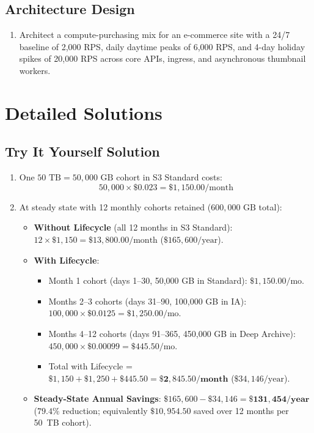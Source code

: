 \subsection*{Architecture Design}
\begin{enumerate}[label=\textbf{Exercise~\thechapter.\arabic*}, leftmargin=*, start=4]
  \item Architect a compute-purchasing mix for an e-commerce site with a 24/7 baseline of 2,000 RPS, daily daytime peaks of 6,000 RPS, and 4-day holiday spikes of 20,000 RPS across core APIs, ingress, and asynchronous thumbnail workers.
\end{enumerate}

\section{Detailed Solutions}

\subsection*{Try It Yourself Solution}
\begin{enumerate}[leftmargin=18pt]
  \item One $50\text{ TB} = 50,000\text{ GB}$ cohort in S3 Standard costs:
  $$50,000 \times \$0.023 = \$1,150.00\text{/month}$$
  \item At steady state with 12 monthly cohorts retained ($600,000\text{ GB}$ total):
  \begin{itemize}[leftmargin=14pt]
    \item \textbf{Without Lifecycle} (all 12 months in S3 Standard): $12 \times \$1,150 = \$13,800.00/\text{month}$ ($\$165,600/\text{year}$).
    \item \textbf{With Lifecycle}:
      \begin{itemize}
        \item Month 1 cohort (days 1--30, 50,000 GB in Standard): $\$1,150.00/\text{mo}$.
        \item Months 2--3 cohorts (days 31--90, 100,000 GB in IA): $100,000 \times \$0.0125 = \$1,250.00/\text{mo}$.
        \item Months 4--12 cohorts (days 91--365, 450,000 GB in Deep Archive): $450,000 \times \$0.00099 = \$445.50/\text{mo}$.
        \item Total with Lifecycle = $\$1,150 + \$1,250 + \$445.50 = \mathbf{\$2,845.50/\text{month}}$ ($\$34,146/\text{year}$).
      \end{itemize}
    \item \textbf{Steady-State Annual Savings}: $\$165,600 - \$34,146 = \mathbf{\$131,454/\text{year}}$ ($79.4\%$ reduction; equivalently $\$10,954.50$ saved over 12 months per 50~TB cohort).
  \end{itemize}
\end{enumerate}

